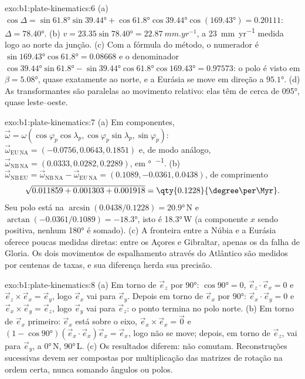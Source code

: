 \begin{solution}{exo:b1:plate-kinematics:6}
(a) $\cos\Delta = \sin\ang{61.8}\sin\ang{39.44} + \cos\ang{61.8}\cos\ang{39.44}
\cos(\ang{169.43}) = 0.20111$: $\Delta = \ang{78.40}$. (b) $v = 23.35
\sin\ang{78.40} = \qty{22.87}{mm.yr^{-1}}$, a \qty{23}{mm.yr^{-1}} medida
logo ao norte da junção. (c) Com a fórmula do método, o numerador
é $\sin\ang{169.43}\cos\ang{61.8} = 0.08668$ e o denominador
$\cos\ang{39.44}\sin\ang{61.8} - \sin\ang{39.44}\cos\ang{61.8}\cos\ang{169.43}
= 0.97573$: o polo é visto em $\beta = \ang{5.08}$, quase exatamente ao norte, e
a Eurásia se move em direção a $\ang{95.1}$. (d) As transformantes são paralelas ao
movimento relativo: elas têm  de cerca de \ang{095}, quase leste--oeste.
\end{solution}

\begin{solution}{exo:b1:plate-kinematics:7}
(a) Em componentes, $\vec\omega = \omega(\cos\varphi_p\cos\lambda_p, \cos\varphi_p\sin\lambda_p,
\sin\varphi_p)$: $\vec\omega_{\mathrm{EU\,NA}} = (-0.0756, 0.0643, 0.1851)$ e, de modo análogo,
$\vec\omega_{\mathrm{NB\,NA}} = (0.0333, 0.0282, 0.2289)$, em
\unit{\degree\per\Myr}. (b) $\vec\omega_{\mathrm{NB\,EU}} =
\vec\omega_{\mathrm{NB\,NA}} - \vec\omega_{\mathrm{EU\,NA}} = (0.1089, -0.0361,
0.0438)$, de comprimento
\[
  \sqrt{0.011859 + 0.001303 + 0.001918} = \qty{0.1228}{\degree\per\Myr}.
\]
Seu polo está na 
$\arcsin(0.0438/0.1228) = \ang{20.9}$\,N e 
$\arctan(-0.0361/0.1089) = \ang{-18.3}$, isto é \ang{18.3}\,W (a
componente $x$ sendo positiva, nenhum \ang{180} é somado). (c) A fronteira entre
a Núbia e a Eurásia oferece poucas medidas diretas: entre os Açores e
Gibraltar, apenas os  da falha de Gloria. Os dois movimentos de espalhamento
através do Atlântico são medidos por centenas de taxas, e sua diferença
herda sua precisão.
\end{solution}

\begin{solution}{exo:b1:plate-kinematics:8}
(a) Em torno de $\vec e_z$ por \ang{90}: $\cos\ang{90} = 0$, $\vec e_z\cdot\vec e_x = 0$
e $\vec e_z\times\vec e_x = \vec e_y$, logo $\vec e_x$ vai para $\vec e_y$. Depois
em torno de $\vec e_x$ por \ang{90}: $\vec e_x\cdot\vec e_y = 0$ e
$\vec e_x\times\vec e_y = \vec e_z$, logo $\vec e_y$ vai para $\vec e_z$: o ponto
termina no polo norte. (b) Em torno de $\vec e_x$ primeiro: $\vec e_x$ está sobre o eixo,
$\vec e_x\times\vec e_x = \vec 0$ e $(1 - \cos\ang{90})(\vec e_x\cdot\vec e_x)
\vec e_x = \vec e_x$, logo não se move; depois, em torno de $\vec e_z$, vai para
$\vec e_y$, a \ang{0}\,N, \ang{90}\,L. (c) Os resultados diferem: 
não comutam. Reconstruções sucessivas devem ser compostas por
multiplicação das matrizes de rotação na ordem certa, nunca somando ângulos
ou polos.
\end{solution}


